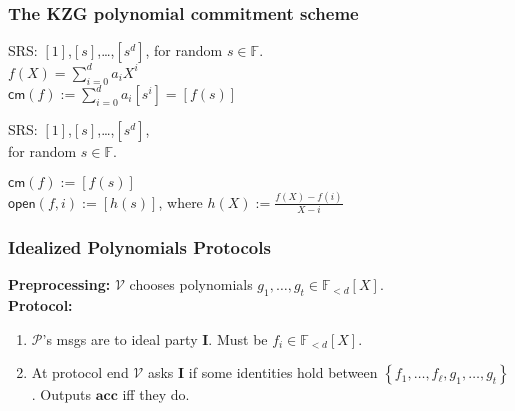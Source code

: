 \documentclass[shadesubsections,trans,14pt,mathserif]{beamer}
\newcommand{\F}{\ensuremath{\mathbb F}}
\newcommand{\set}[1]{\ensuremath{\left\{#1\right\}}}
\newcommand{\enc}[1]{\ensuremath{\left[#1\right ]}}
\newcommand{\cm}{\ensuremath{\mathsf{cm}}}
\newcommand{\open}[1]{\ensuremath{\mathsf{open}(#1)}}
\newcommand{\defeq}{\ensuremath{:=}}
\newcommand{\ver}{\ensuremath{\mathcal{V}}}
\newcommand{\prv}{\ensuremath{\mathcal{P}}}
\newcommand{\polysofdeg}[1]{\F_{< #1}[X]}
\newcommand{\acc}{{\mathbf{acc}}}
\newcommand{\ideal}{\mathbf{I}}
\begin{document}
\begin{frame}
  \frametitle{The KZG polynomial commitment scheme}   %
 SRS: \enc{1},\enc{s},\ldots,\enc{s^d}, for random $s\in \F$.\\
 \vspace{0.4in}
 $f(X) = \sum_{i=0}^d a_i X^i$\\
 \vspace{0.4in}
 $\cm(f)\defeq  \sum_{i=0}^d a_i \enc{s^i}=  \enc{f(s)}$\\
 \vspace{0.4in}
 
\end{frame}
\begin{frame}
 SRS: \enc{1},\enc{s},\ldots,\enc{s^d},\\
 for random $s\in \F$.
 \vspace{0.4in}
 
 $\cm(f)\defeq   \enc{f(s)}$\\
 \vspace{0.4in}
$\open{f,i}\defeq \enc{h(s)}$, where
$h(X)\defeq \frac{f(X)-f(i)}{X-i}$
 \vspace{0.4in}
 
\end{frame}



\begin{frame}
\frametitle{Idealized Polynomials Protocols}   %
 
 \textbf{Preprocessing:} $\ver$ chooses polynomials $g_1,\ldots,g_t\in \polysofdeg{d}$.\\
 \vspace{0.4in}
\textbf{Protocol:}
  \begin{enumerate}

\item 
$\prv$'s  msgs are to ideal party $\ideal$. Must be $f_i\in \polysofdeg{d}$.
 \item At protocol end $\ver$ asks $\ideal$ if some identities hold between $\set{f_1,\ldots,f_\ell,g_1,\ldots,g_t}$.  Outputs $\acc$ iff they do.
\end{enumerate}
\end{frame}
\end{document}
